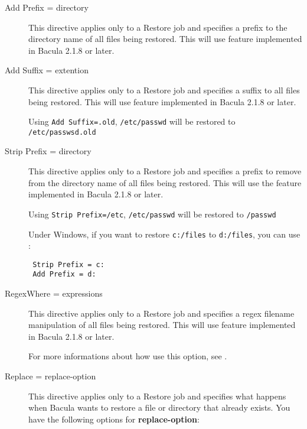 \begin{description}
\item [Add Prefix = \lt{}directory\gt{}]
  \label{confaddprefix}
  This directive applies only to a Restore job and specifies a prefix to the
  directory name of all files being restored.  This will use  feature implemented in Bacula 2.1.8 or later.  

\item [Add Suffix = \lt{}extention\gt{}]
  This directive applies only to a Restore job and specifies a suffix to all
  files being restored.  This will use 
  feature implemented in Bacula 2.1.8 or later.

  Using \texttt{Add Suffix=.old}, \texttt{/etc/passwd} will be restored to
  \texttt{/etc/passwsd.old}

\item [Strip Prefix = \lt{}directory\gt{}]
  This directive applies only to a Restore job and specifies a prefix to remove
  from the directory name of all files being restored.  This will use the
   feature implemented in Bacula 2.1.8 
  or later.

  Using \texttt{Strip Prefix=/etc}, \texttt{/etc/passwd} will be restored to
  \texttt{/passwd}

  Under Windows, if you want to restore \texttt{c:/files} to \texttt{d:/files},
  you can use :

\begin{verbatim}
 Strip Prefix = c:
 Add Prefix = d:
\end{verbatim}

\item [RegexWhere = \lt{}expressions\gt{}]
  This directive applies only to a Restore job and specifies a regex filename
  manipulation of all files being restored.  This will use  feature implemented in Bacula 2.1.8 or later.

  For more informations about how use this option, see
  .

\item [Replace = \lt{}replace-option\gt{}]
   This directive applies only to a Restore job and specifies what happens
   when Bacula wants to restore a file or directory that already exists.
   You have the following options for {\bf replace-option}:


\end{description}
